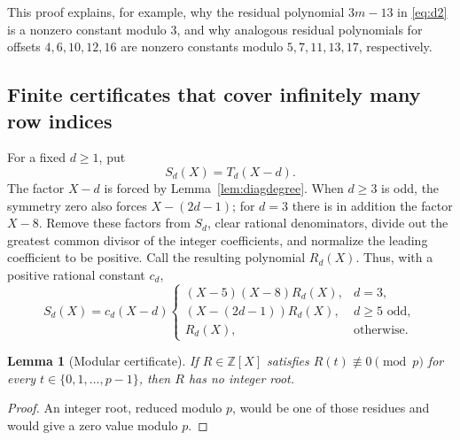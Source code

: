 \documentclass[11pt,a4paper]{article}
\numberwithin{equation}{section}
\newtheorem{lemma}[theorem]{Lemma}
\theoremstyle{definition}
\theoremstyle{remark}
\newcommand{\Z}{\mathbb Z}
\begin{document}
This proof explains, for example, why the residual polynomial $3m-13$ in
\eqref{eq:d2} is a nonzero constant modulo $3$, and why analogous residual
polynomials for offsets $4,6,10,12,16$ are nonzero constants modulo
$5,7,11,13,17$, respectively.

\subsection{Finite certificates that cover infinitely many row indices}
For a fixed $d\ge1$, put
\[
 S_d(X)=T_d(X-d).
\]
The factor $X-d$ is forced by Lemma~\ref{lem:diagdegree}. When $d\ge3$ is
odd, the symmetry zero also forces $X-(2d-1)$; for $d=3$ there is in
addition the factor $X-8$.
Remove these factors from $S_d$, clear rational denominators, divide out
the greatest common divisor of the integer coefficients, and normalize the
leading coefficient to be positive. Call the resulting polynomial $R_d(X)$.
Thus, with a positive rational constant $c_d$,
\begin{equation}\label{eq:Rd}
 S_d(X)=c_d(X-d)
 \begin{cases}
 (X-5)(X-8)R_d(X),&d=3,\\
 (X-(2d-1))R_d(X),&d\ge5\text{ odd},\\
 R_d(X),&\text{otherwise}.
 \end{cases}
\end{equation}

\begin{lemma}[Modular certificate]\label{lem:modcert}
If $R\in\Z[X]$ satisfies $R(t)\not\equiv0\pmod p$ for every
$t\in\{0,1,\ldots,p-1\}$, then $R$ has no integer root.
\end{lemma}
\begin{proof}
An integer root, reduced modulo $p$, would be one of those residues and
would give a zero value modulo $p$.
\end{proof}
\end{document}
